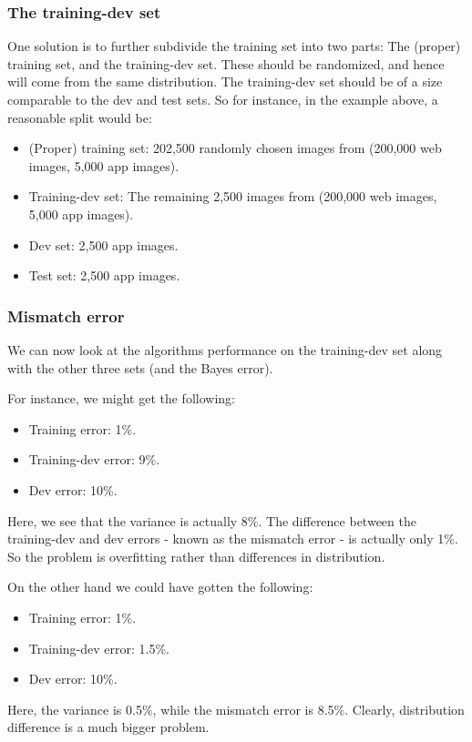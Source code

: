 \documentclass[12pt, a4paper]{article}
\numberwithin{equation}{section}
\begin{document}
\subsubsection{The training-dev set}
One solution is to further subdivide the training set into two parts: The (proper) training set, and the training-dev set. These should be randomized, and hence will come from the same distribution. The training-dev set should be of a size comparable to the dev and test sets. So for instance, in the example above, a reasonable split would be:
\begin{itemize}
\item (Proper) training set: 202,500 randomly chosen images from (200,000 web images, 5,000 app images).
\item Training-dev set: The remaining 2,500 images from (200,000 web images, 5,000 app images).
\item Dev set: 2,500 app images.
\item Test set: 2,500 app images.
\end{itemize} 

\subsubsection{Mismatch error}
We can now look at the algorithms performance on the training-dev set along with the other three sets (and the Bayes error).

For instance, we might get the following:
\begin{itemize}
\item Training error: 1\%.
\item Training-dev error: 9\%.
\item Dev error: 10\%.
\end{itemize}
Here, we see that the variance is actually 8\%. The difference between the training-dev and dev errors - known as the mismatch error - is actually only 1\%. So the problem is overfitting rather than differences in distribution.

On the other hand we could have gotten the following:
\begin{itemize}
\item Training error: 1\%.
\item Training-dev error: 1.5\%.
\item Dev error: 10\%.
\end{itemize}
Here, the variance is 0.5\%, while the mismatch error is 8.5\%. Clearly, distribution difference is a much bigger problem.
\end{document}
